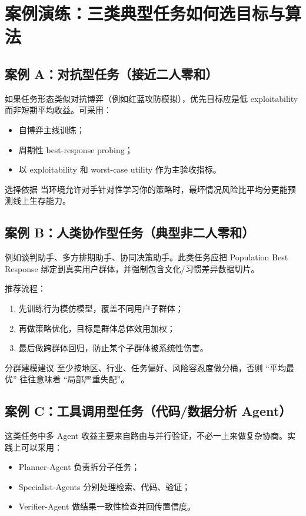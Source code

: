 \section{案例演练：三类典型任务如何选目标与算法}

\subsection{案例 A：对抗型任务（接近二人零和）}
如果任务形态类似对抗博弈（例如红蓝攻防模拟），优先目标应是低 exploitability 而非短期平均收益。可采用：
\begin{itemize}
    \item 自博弈主线训练；
    \item 周期性 best-response probing；
    \item 以 exploitability 和 worst-case utility 作为主验收指标。
\end{itemize}

\begin{importantbox}{选择依据}
当环境允许对手针对性学习你的策略时，最坏情况风险比平均分更能预测线上生存能力。
\end{importantbox}

\subsection{案例 B：人类协作型任务（典型非二人零和）}
例如谈判助手、多方排期助手、协同决策助手。此类任务应把 Population Best Response 绑定到真实用户群体，并强制包含文化/习惯差异数据切片。

推荐流程：
\begin{enumerate}
    \item 先训练行为模仿模型，覆盖不同用户子群体；
    \item 再做策略优化，目标是群体总体效用加权；
    \item 最后做跨群体回归，防止某个子群体被系统性伤害。
\end{enumerate}

\begin{knowledgebox}{分群建模建议}
至少按地区、行业、任务偏好、风险容忍度做分桶，否则 ``平均最优'' 往往意味着 ``局部严重失配''。
\end{knowledgebox}

\subsection{案例 C：工具调用型任务（代码/数据分析 Agent）}
这类任务中多 Agent 收益主要来自路由与并行验证，不必一上来做复杂协商。实践上可以采用：
\begin{itemize}
    \item Planner-Agent 负责拆分子任务；
    \item Specialist-Agents 分别处理检索、代码、验证；
    \item Verifier-Agent 做结果一致性检查并回传置信度。
\end{itemize}

